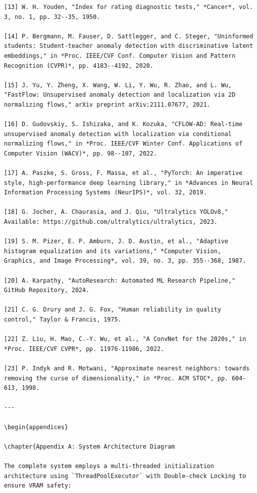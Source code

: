 \documentclass[12pt,a4paper,oneside]{report}
\begin{document}
\begin{verbatim}
[13] W. H. Youden, "Index for rating diagnostic tests," *Cancer*, vol. 3, no. 1, pp. 32--35, 1950.

[14] P. Bergmann, M. Fauser, D. Sattlegger, and C. Steger, "Uninformed students: Student-teacher anomaly detection with discriminative latent embeddings," in *Proc. IEEE/CVF Conf. Computer Vision and Pattern Recognition (CVPR)*, pp. 4183--4192, 2020.

[15] J. Yu, Y. Zheng, X. Wang, W. Li, Y. Wu, R. Zhao, and L. Wu, "FastFlow: Unsupervised anomaly detection and localization via 2D normalizing flows," arXiv preprint arXiv:2111.07677, 2021.

[16] D. Gudovskiy, S. Ishizaka, and K. Kozuka, "CFLOW-AD: Real-time unsupervised anomaly detection with localization via conditional normalizing flows," in *Proc. IEEE/CVF Winter Conf. Applications of Computer Vision (WACV)*, pp. 98--107, 2022.

[17] A. Paszke, S. Gross, F. Massa, et al., "PyTorch: An imperative style, high-performance deep learning library," in *Advances in Neural Information Processing Systems (NeurIPS)*, vol. 32, 2019.

[18] G. Jocher, A. Chaurasia, and J. Qiu, "Ultralytics YOLOv8," Available: https://github.com/ultralytics/ultralytics, 2023.

[19] S. M. Pizer, E. P. Amburn, J. D. Austin, et al., "Adaptive histogram equalization and its variations," *Computer Vision, Graphics, and Image Processing*, vol. 39, no. 3, pp. 355--368, 1987.

[20] A. Karpathy, "AutoResearch: Automated ML Research Pipeline," GitHub Repository, 2024.

[21] C. G. Drury and J. G. Fox, "Human reliability in quality control," Taylor & Francis, 1975.

[22] Z. Liu, H. Mao, C.-Y. Wu, et al., "A ConvNet for the 2020s," in *Proc. IEEE/CVF CVPR*, pp. 11976-11986, 2022.

[23] P. Indyk and R. Motwani, "Approximate nearest neighbors: towards removing the curse of dimensionality," in *Proc. ACM STOC*, pp. 604-613, 1998.

---

\begin{appendices}

\chapter{Appendix A: System Architecture Diagram

The complete system employs a multi-threaded initialization architecture using `ThreadPoolExecutor` with Double-check Locking to ensure VRAM safety:

\end{verbatim}
\end{document}
